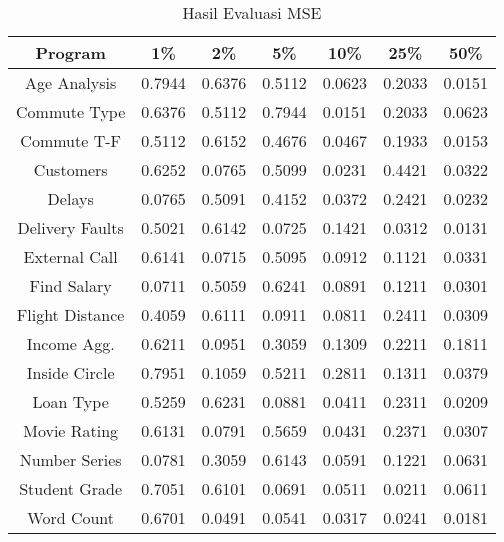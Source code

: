 \begin{enumerate}[topsep=0pt]
      \begin{table}[H]
      \centering
      \caption{Hasil Evaluasi MSE}
      \label{tab:HasilMSE}
      \begin{tabular}{|c|c|c|c|c|c|c|}
      \hline
      \textbf{Program} & \textbf{1\%} & \textbf{2\%} & \textbf{5\%} & \textbf{10\%} & \textbf{25\%} & \textbf{50\%} \\
      \hline
      Age Analysis & 0.7944 & 0.6376 & 0.5112 & 0.0623 & 0.2033 & 0.0151 \\
      \hline
      Commute Type & 0.6376 & 0.5112 & 0.7944 & 0.0151 & 0.2033 & 0.0623 \\
      \hline
      Commute T-F & 0.5112 & 0.6152 & 0.4676 & 0.0467 & 0.1933 & 0.0153 \\
      \hline
      Customers & 0.6252 & 0.0765 & 0.5099 & 0.0231 & 0.4421 & 0.0322 \\
      \hline
      Delays & 0.0765 & 0.5091 & 0.4152 & 0.0372 & 0.2421 & 0.0232 \\
      \hline
      Delivery Faults & 0.5021 & 0.6142 & 0.0725 & 0.1421 & 0.0312 & 0.0131 \\
      \hline
      External Call & 0.6141 & 0.0715 & 0.5095 & 0.0912 & 0.1121 & 0.0331 \\
      \hline
      Find Salary & 0.0711 & 0.5059 & 0.6241 & 0.0891 & 0.1211 & 0.0301 \\
      \hline
      Flight Distance & 0.4059 & 0.6111 & 0.0911 & 0.0811 & 0.2411 & 0.0309 \\
      \hline
      Income Agg. & 0.6211 & 0.0951 & 0.3059 & 0.1309 & 0.2211 & 0.1811 \\
      \hline
      Inside Circle & 0.7951 & 0.1059 & 0.5211 & 0.2811 & 0.1311 & 0.0379 \\
      \hline
      Loan Type & 0.5259 & 0.6231 & 0.0881 & 0.0411 & 0.2311 & 0.0209 \\
      \hline
      Movie Rating & 0.6131 & 0.0791 & 0.5659 & 0.0431 & 0.2371 & 0.0307 \\
      \hline
      Number Series & 0.0781 & 0.3059 & 0.6143 & 0.0591 & 0.1221 & 0.0631 \\
      \hline
      Student Grade & 0.7051 & 0.6101 & 0.0691 & 0.0511 & 0.0211 & 0.0611 \\
      \hline
      Word Count & 0.6701 & 0.0491 & 0.0541 & 0.0317 & 0.0241 & 0.0181 \\
      \hline
      \end{tabular}
      \end{table}


\end{enumerate}
